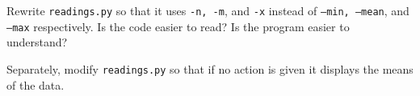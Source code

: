 \documentclass{beamer}
\begin{document}
\begin{frame}{ }
Rewrite \texttt{readings.py} so that it uses \texttt{-n, -m}, and \texttt{-x} instead of \texttt{--min, --mean}, and \texttt{--max} respectively. Is the code easier to read? Is the program easier to understand?

\end{frame}


\begin{frame}{ }
Separately, modify \texttt{readings.py} so that if no action is given it displays the means of the data.
\end{frame}

\end{document}
